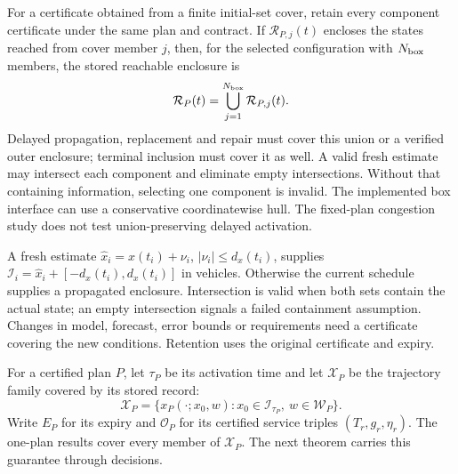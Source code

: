 \documentclass[preprint,12pt]{elsarticle}
\theoremstyle{definition}
\theoremstyle{plain}
\theoremstyle{definition}
\theoremstyle{plain}
\begin{document}
For a certificate obtained from a finite initial-set cover, retain every
component certificate under the same plan and contract. If
$\mathcal R_{P,j}(t)$ encloses the states reached from cover member $j$,
then, for the selected configuration with $N_{\rm box}$ members,
the stored reachable enclosure is
\begin{equation}
 \mathcal R_P(t)=\bigcup_{j=1}^{N_{\rm box}}\mathcal R_{P,j}(t).
 \label{eq:covered-reachable-union}
\end{equation}
Delayed propagation, replacement and repair must cover this union or a verified
outer enclosure; terminal inclusion must cover it as well. A valid fresh
estimate may intersect each component and eliminate empty intersections.
Without that containing information, selecting one component is invalid.
The implemented box interface can use a conservative coordinatewise hull.
The fixed-plan congestion study does not test union-preserving delayed
activation.

A fresh estimate $\widehat x_i=x(t_i)+\nu_i$, $|\nu_i|\le d_x(t_i)$,
supplies $\mathcal I_i=\widehat x_i+[-d_x(t_i),d_x(t_i)]$ in vehicles.
Otherwise the current schedule supplies a propagated enclosure.
Intersection is valid when both sets contain the actual state; an empty
intersection signals a failed containment assumption. Changes in model,
forecast, error bounds or requirements need a certificate covering the
new conditions. Retention uses the original certificate and expiry.

For a certified plan $P$, let $\tau_P$ be its activation time and
let $\mathcal X_P$ be the trajectory family covered by its stored record:
\begin{equation}
\mathcal X_P=\{x_P(\cdot;x_0,w):
 x_0\in\mathcal I_{\tau_P},\ w\in\mathcal W_P\}.
\label{eq:execution-covered-family}
\end{equation}
Write $E_P$ for its expiry and $\mathcal O_P$ for its certified service
triples $(T_r,g_r,\eta_r)$. The one-plan results cover every member of
$\mathcal X_P$. The next theorem carries this guarantee through decisions.
\end{document}
